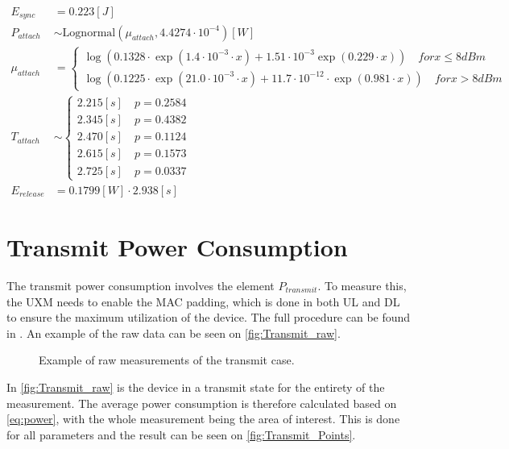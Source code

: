 \begin{align}
E_{sync} &= 0.223 [J] \\
P_{attach} &\sim\text{Lognormal}(\mu_{attach},4.4274\cdot 10^{-4}) [W] \\
\mu_{attach} &= \begin{cases} \log\left(0.1328\cdot\exp(1.4\cdot 10^{-3}\cdot x) + 1.51\cdot 10^{-3}\exp(0.229\cdot x)\right) \quad for x \leq 8 dBm \\
\log\left(0.1225\cdot\exp(21.0\cdot 10^{-3}\cdot x) + 11.7\cdot 10^{-12}\cdot \exp(0.981\cdot x)\right) \quad for x > 8 dBm \end{cases} \\
T_{attach} &\sim\begin{cases} 2.215 [s] \quad p = 0.2584\\
2.345 [s] \quad p = 0.4382\\
2.470 [s] \quad p = 0.1124\\
2.615 [s] \quad p = 0.1573\\
2.725 [s] \quad p = 0.0337
\end{cases}\\
E_{release} &=0.1799 [W] \cdot 2.938 [s] 
\end{align}




\section{Transmit Power Consumption}

The transmit power consumption involves the element $P_{transmit}$. To measure this, the UXM needs to enable the MAC padding, which is done in both UL and DL to ensure the maximum utilization of the device. The full procedure can be found in . An example of the raw data can be seen on \autoref{fig:Transmit_raw}.

\begin{figure}[H]
\centering
{}
\resizebox{0.6\textwidth}{!}{
}
\caption{Example of raw measurements of the transmit case.}
\label{fig:Transmit_raw}
\end{figure}

In \autoref{fig:Transmit_raw} is the device in a transmit state for the entirety of the measurement. The average power consumption is therefore calculated based on \autoref{eq:power}, with the whole measurement being the area of interest. This is done for all parameters and the result can be seen on \autoref{fig:Transmit_Points}.

